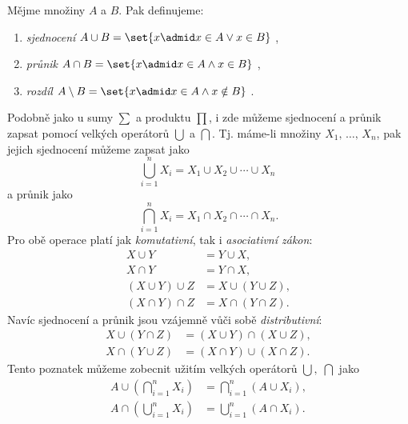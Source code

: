 \begin{definition}\label{def:zakladni_mnozinove_operace}
    Mějme množiny $A$ a $B$. Pak definujeme:
    \begin{enumerate}[label=(\roman*)]
        \item \emph{sjednocení} $A \cup B=\set{x \admid x \in A \lor x \in B}$ ,
        \item \emph{průnik} $A \cap B=\set{x \admid x \in A \land x \in B}$ ,
        \item \emph{rozdíl} $A \setminus B=\set{x \admid x \in A \land x \notin B}$ .
    \end{enumerate}
\end{definition}

Podobně jako u sumy $\sum$ a produktu $\prod$, i zde můžeme sjednocení a průnik zapsat pomocí velkých operátorů $\bigcup$ a $\bigcap$. Tj. máme-li množiny $X_1,\,\dots,\,X_n$, pak jejich sjednocení můžeme zapsat jako
\begin{equation*}
    \bigcup\limits_{i=1}^{n}{X_i}=X_1 \cup X_2 \cup \cdots \cup X_n\;
\end{equation*}
a průnik jako
\begin{equation*}
    \bigcap\limits_{i=1}^{n}{X_i}=X_1 \cap X_2 \cap \cdots \cap X_n.
\end{equation*}
Pro obě operace platí jak \emph{komutativní}, tak i \emph{asociativní zákon}:
\begin{align*}
    X \cup Y&=Y \cup X,\\
    X \cap Y&=Y \cap X,\\
    (X \cup Y) \cup Z &= X \cup (Y \cup Z),\\
    (X \cap Y) \cap Z &= X \cap (Y \cap Z).
\end{align*}
Navíc sjednocení a průnik jsou vzájemně vůči sobě \emph{distributivní}:
\begin{align*}
    X \cup (Y \cap Z) &= (X \cup Y) \cap (X \cup Z),\\
    X \cap (Y \cup Z) &= (X \cap Y) \cup (X \cap Z).
\end{align*}
Tento poznatek můžeme zobecnit užitím velkých operátorů $\bigcup,\;\bigcap$ jako
\begin{align*}
    A \cup \left(\bigcap\limits_{i=1}^{n}{X_i}\right)&=\bigcap\limits_{i=1}^{n}{(A \cup X_i)},\\
    A \cap \left(\bigcup\limits_{i=1}^{n}{X_i}\right)&=\bigcup\limits_{i=1}^{n}{(A \cap X_i)}.
\end{align*}

